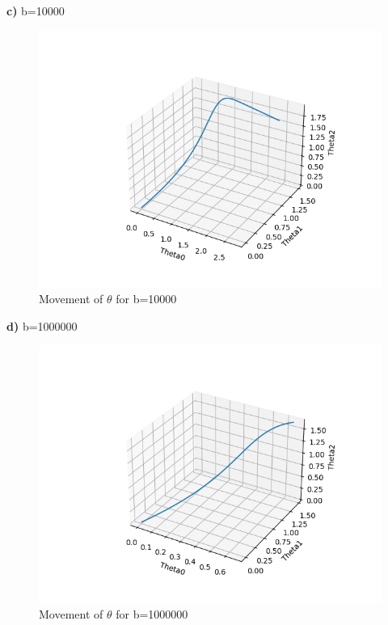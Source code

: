 \documentclass[12pt]{article}
\begin{document}
\textbf{c)} b=10000
\begin{figure}[H]
\centering
  \includegraphics[scale=0.78]{contourPlot3.png}
  \caption{Movement of $\theta$ for b=10000}
  \label{fig3A}
\end{figure}
\textbf{d)} b=1000000
\begin{figure}[H]
\centering
  \includegraphics[scale=0.78]{contourPlot4.png}
  \caption{Movement of $\theta$ for b=1000000}
  \label{fig3A}
\end{figure}
\end{document}
